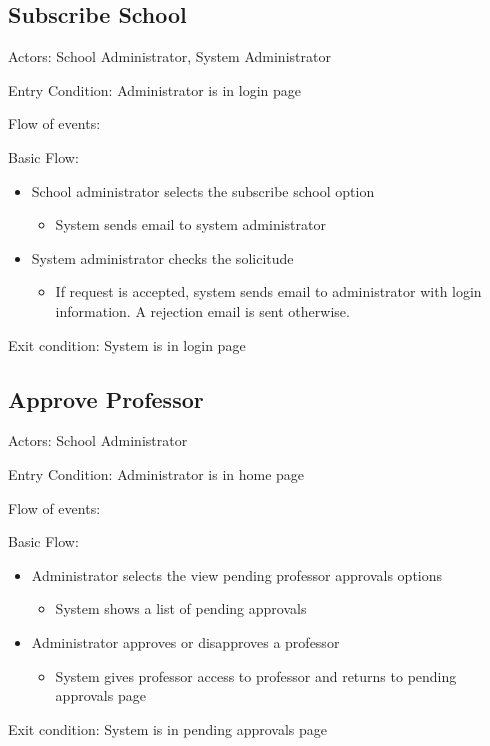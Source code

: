 \label{sec:useCases}
\subsection*{Subscribe School}
Actors: School Administrator, System Administrator

Entry Condition: Administrator is in login page

Flow of events:

Basic Flow:

\begin{itemize}
\item School administrator selects the subscribe school option
\begin{itemize}
\item System sends email to system administrator
\end{itemize}
\item System administrator checks the solicitude
\begin{itemize}
\item If request is accepted, system sends email to administrator with 
login information. A rejection email is sent otherwise.
\end{itemize}
\end{itemize}
Exit condition: System is in login page

\subsection*{Approve Professor}
Actors: School Administrator

Entry Condition: Administrator is in home page

Flow of events:

Basic Flow:

\begin{itemize}
\item Administrator selects the view pending professor approvals options
\begin{itemize}
\item System shows a list of pending approvals
\end{itemize}
\item Administrator approves or disapproves a professor
\begin{itemize}
\item System gives professor access to professor and returns to 
pending approvals page
\end{itemize}
\end{itemize}
Exit condition: System is in pending approvals page



